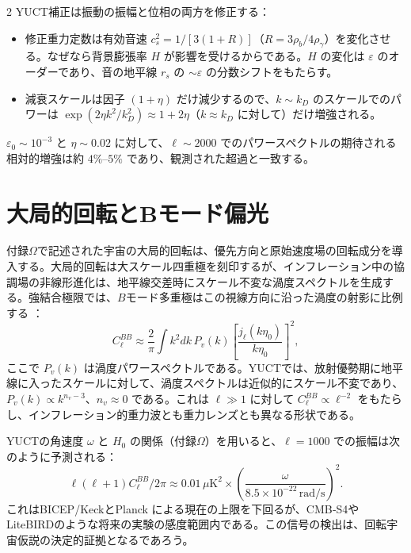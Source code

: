 \documentclass[11pt,a4paper]{article}
\begin{document}
\begin{multicols}{2}
		YUCT補正は振動の振幅と位相の両方を修正する：
		\begin{itemize}
			\item 修正重力定数は有効音速 \(c_s^2 = 1/[3(1+R)]\)（\(R = 3\rho_b/4\rho_\gamma\)）を変化させる。なぜなら背景膨張率 \(H\) が影響を受けるからである。\(H\) の変化は \(\varepsilon\) のオーダーであり、音の地平線 \(r_s\) の \(\sim \varepsilon\) の分数シフトをもたらす。
			\item 減衰スケールは因子 \((1+\eta)\) だけ減少するので、\(k \sim k_D\) のスケールでのパワーは \(\exp(2\eta k^2/k_D^2) \approx 1 + 2\eta\)（\(k \approx k_D\) に対して）だけ増強される。
		\end{itemize}
		\(\varepsilon_0 \sim 10^{-3}\) と \(\eta \sim 0.02\) に対して、\(\ell \sim 2000\) でのパワースペクトルの期待される相対的増強は約 \(4\%\)--\(5\%\) であり、観測された超過と一致する。
		
		\section{大局的回転とBモード偏光}
		
		付録\(\Omega\)で記述された宇宙の大局的回転は、優先方向と原始速度場の回転成分を導入する。大局的回転は大スケール四重極を刻印するが、インフレーション中の協調場の非線形進化は、地平線交差時にスケール不変な渦度スペクトルを生成する。強結合極限では、\(B\)モード多重極はこの視線方向に沿った渦度の射影に比例する \cite{Cooray2005}：
		\begin{equation}
			C_\ell^{BB} \approx \frac{2}{\pi} \int k^2 dk \, P_v(k) \left[ \frac{j_\ell(k\eta_0)}{k\eta_0} \right]^2,
		\end{equation}
		ここで \(P_v(k)\) は渦度パワースペクトルである。YUCTでは、放射優勢期に地平線に入ったスケールに対して、渦度スペクトルは近似的にスケール不変であり、\(P_v(k) \propto k^{n_v-3}\)、\(n_v \approx 0\) である。これは \(\ell \gg 1\) に対して \(C_\ell^{BB} \propto \ell^{-2}\) をもたらし、インフレーション的重力波とも重力レンズとも異なる形状である。
		
		YUCTの角速度 \(\omega\) と \(H_0\) の関係（付録\(\Omega\)）を用いると、\(\ell=1000\) での振幅は次のように予測される：
		\begin{equation}
			\ell(\ell+1)C_\ell^{BB}/2\pi \approx 0.01\,\mu\text{K}^2 \times \left(\frac{\omega}{8.5\times10^{-22}\,\text{rad/s}}\right)^2.
			\label{eq:BB_amplitude}
		\end{equation}
		これはBICEP/KeckとPlanck \cite{BICEP2021} による現在の上限を下回るが、CMB‑S4やLiteBIRDのような将来の実験の感度範囲内である。この信号の検出は、回転宇宙仮説の決定的証拠となるであろう。
		

\end{multicols}
\end{document}
